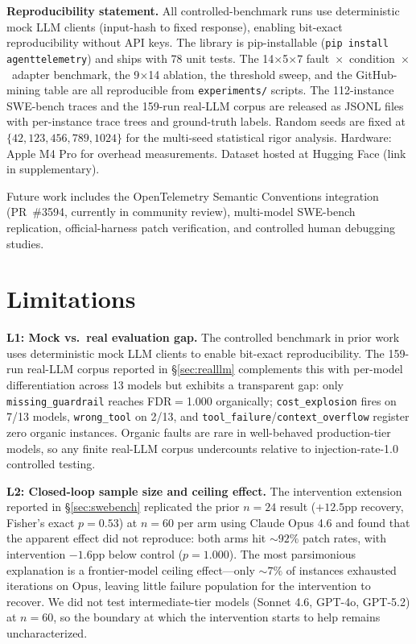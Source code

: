 \documentclass[11pt]{article}
\begin{document}
\textbf{Reproducibility statement.}
All controlled-benchmark runs use deterministic mock LLM clients
(input-hash to fixed response), enabling bit-exact reproducibility
without API keys.  The library is pip-installable
(\texttt{pip install agenttelemetry}) and ships with 78 unit tests.
The 14$\times$5$\times$7 fault~$\times$~condition~$\times$~adapter
benchmark, the 9$\times$14 ablation, the threshold sweep, and the
GitHub-mining table are all reproducible from
\texttt{experiments/} scripts.  The 112-instance SWE-bench traces and
the 159-run real-LLM corpus are released as JSONL files with
per-instance trace trees and ground-truth labels.  Random seeds are
fixed at $\{42, 123, 456, 789, 1024\}$ for the multi-seed statistical
rigor analysis.  Hardware: Apple M4 Pro for overhead measurements.
Dataset hosted at Hugging Face (link in supplementary).

Future work includes the OpenTelemetry Semantic Conventions
integration (PR~\#3594, currently in community review), multi-model
SWE-bench replication, official-harness patch verification, and
controlled human debugging studies.

\section*{Limitations}
\label{sec:limitations}

\textbf{L1: Mock vs.\ real evaluation gap.} The controlled benchmark
in prior work~\citep{aiware2026} uses deterministic mock LLM clients
to enable bit-exact reproducibility. The 159-run real-LLM corpus
reported in \S\ref{sec:realllm} complements this with per-model
differentiation across 13 models but exhibits a transparent gap: only
\texttt{missing\_guardrail} reaches FDR$=$1.000 organically;
\texttt{cost\_explosion} fires on 7/13 models, \texttt{wrong\_tool} on
2/13, and \texttt{tool\_failure}/\texttt{context\_overflow} register
zero organic instances. Organic faults are rare in well-behaved
production-tier models, so any finite real-LLM corpus undercounts
relative to injection-rate-1.0 controlled testing.

\textbf{L2: Closed-loop sample size and ceiling effect.} The
intervention extension reported in \S\ref{sec:swebench} replicated
the prior $n{=}24$ result ($+12.5$pp recovery, Fisher's exact
$p{=}0.53$) at $n{=}60$ per arm using Claude Opus 4.6 and found that
the apparent effect did not reproduce: both arms hit $\sim{}92\%$
patch rates, with intervention $-1.6$pp below control
($p{=}1.000$). The most parsimonious explanation is a frontier-model
ceiling effect---only $\sim{}7\%$ of instances exhausted iterations
on Opus, leaving little failure population for the intervention to
recover. We did not test intermediate-tier models (Sonnet 4.6,
GPT-4o, GPT-5.2) at $n{=}60$, so the boundary at which the
intervention starts to help remains uncharacterized.
\end{document}
